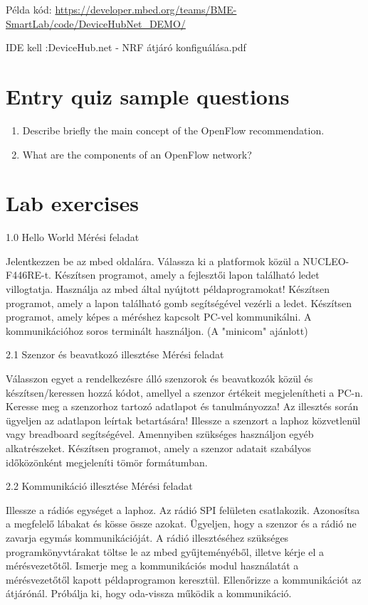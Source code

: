 \documentclass[a4paper]{article}
\begin{document}
Példa kód: \url{https://developer.mbed.org/teams/BME-SmartLab/code/DeviceHubNet_DEMO/}

IDE kell :DeviceHub.net - NRF átjáró konfiguálása.pdf

\appendix

\section{Entry quiz sample questions}

\begin{enumerate}
    \item Describe briefly the main concept of the OpenFlow recommendation.
    \item What are the components of an OpenFlow network?
\end{enumerate}

\section{Lab exercises}

1.0 Hello World
Mérési feladat

    Jelentkezzen be az mbed oldalára. Válassza ki a platformok közül a NUCLEO-F446RE-t.
    Készítsen programot, amely a fejlesztői lapon található ledet villogtatja.
    Használja az mbed által nyújtott példaprogramokat!
    Készítsen programot, amely a lapon található gomb segítségével vezérli a ledet.
    Készítsen programot, amely képes a méréshez kapcsolt PC-vel kommunikálni. A kommunikációhoz soros terminált használjon. (A "minicom" ajánlott)

2.1 Szenzor és beavatkozó illesztése
Mérési feladat

    Válasszon egyet a rendelkezésre álló szenzorok és beavatkozók közül és készítsen/keressen hozzá kódot, amellyel a szenzor értékeit megjelenítheti a PC-n.
    Keresse meg a szenzorhoz tartozó adatlapot és tanulmányozza! Az illesztés során ügyeljen az adatlapon leírtak betartására!
    Illessze a szenzort a laphoz közvetlenül vagy breadboard segítségével. Amennyiben szükséges használjon egyéb alkatrészeket.
    Készítsen programot, amely a szenzor adatait szabályos időközönként megjeleníti tömör formátumban.

2.2 Kommunikáció illesztése
Mérési feladat

    Illessze a rádiós egységet a laphoz. Az rádió SPI felületen csatlakozik. Azonosítsa a megfelelő lábakat és kösse össze azokat. Ügyeljen, hogy a szenzor és a rádió ne zavarja egymás kommunikációját.
    A rádió illesztéséhez szükséges programkönyvtárakat töltse le az mbed gyűjteményéből, illetve kérje el a mérésvezetőtől.
    Ismerje meg a kommunikációs modul használatát a mérésvezetőtől kapott példaprogramon keresztül.
    Ellenőrizze a kommunikációt az átjárónál. Próbálja ki, hogy oda-vissza működik a kommunikáció.
\end{document}
